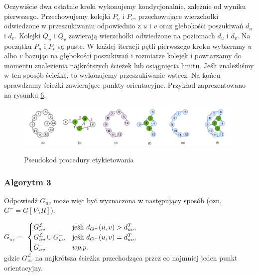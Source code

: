 \documentclass{article}
\theoremstyle{definition}
\begin{document}
        Oczywiście dwa ostatnie kroki wykonujemy kondycjonalnie, zależnie od wyniku pierwszego. Przechowujemy kolejki $P_u$ i $P_v$, przechowujące wierzchołki odwiedzone w przeszukiwaniu odpowiednio z $u$ i $v$ oraz głebokości poszukiwań $d_u$ i $d_v$. Kolejki $Q_u$ i $Q_v$ zawierają wierzchołki odwiedzone na poziomach $d_u$ i $d_v$. Na początku $P_u$ i $P_v$ są puste. W każdej iteracji pętli pierwszego kroku wybieramy $u$ albo $v$ bazując na głębokości poszukiwań i rozmiarze kolejek i powtarzamy do momentu znalezienia najkrótszych ścieżek lub osiągnięcia limitu. Jeśli znależliśmy w ten sposób ścieżkę, to wykonujemy przeszukiwanie wstecz. Na końcu sprawdzamy ścieżki zawierające punkty orientacyjne. Przykład zaprezentowano na rysunku \hyperref[fig:search]{6}.
        \begin{figure}[!tbh]
            \includegraphics[width=11cm]{img/search.png}
            \centering
            \label{fig:search}
            \caption{Pseudokod procedury etykietowania}
        \end{figure}
    
        
    \subsubsection*{Algorytm 3} 
        Odpowiedź $G_{uv}$ może więc być wyznaczona w następujący sposób (ozn, $G^{-} = G[V \setminus R]$).

        $G_{uv} = $
        $\begin{cases}
            G_{uv}^{\mathcal{L}} & \textnormal{jeśli }d_{G^{-}}(u, v) > d_{uv}^T, \\
            G_{uv}^{\mathcal{L}} \cup G_{uv}^{-} & \textnormal{jeśli }d_{G^{-}}(u, v) = d_{uv}^T, \\
            G_{uv}^{-} & w p.p. \\

        \end{cases}$\\
        gdzie $G_{uv}^{\mathcal{L}}$ na najkrótsza ścieżka przechodząca przez co najmniej jeden punkt orientacyjny. 
\end{document}
